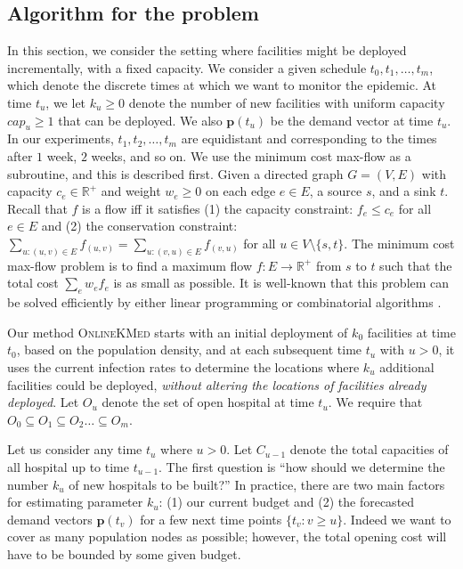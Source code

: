 \subsection*{Algorithm for the \probinc{} problem}
In this section, we consider the setting where facilities might be deployed incrementally, with a fixed capacity. We consider a given schedule $t_0, t_1, \ldots, t_m$, which denote the discrete times at which we want to monitor the epidemic. At time $t_u$, we let $k_u \geq 0$ denote the number of new facilities with uniform capacity $cap_u \geq 1$ that can be deployed. We also $\mathbf{p}(t_u)$ be the demand vector at time $t_u$. In our experiments, $t_1, t_2, \ldots, t_m$ are equidistant and corresponding to the times after $1$ week, $2$ weeks, and so on. 
We use the minimum cost max-flow as a subroutine, and this is described first.
Given a directed graph $G = (V, E)$ with capacity $c_e \in \mathbb{R}^+$ and weight $w_e \geq 0$ on each edge $e \in E$, a source $s$, and a sink $t$. Recall that $f$ is a flow iff it satisfies (1) the capacity constraint: $f_e \leq c_e$ for all $e \in E$ and (2) the conservation constraint: $\sum_{u:(u,v)\in E} f_{(u,v)} = \sum_{u:(v,u) \in E} f_{(v,u)}$ for all $u \in V \setminus \{s, t\}$. The minimum cost max-flow problem is to find a maximum flow $f: E \to \mathbb{R}^+$ from $s$ to $t$ such that the total cost $\sum_e w_e f_e$ is as small as possible.  It is well-known that this problem can be solved efficiently by either linear programming or combinatorial algorithms \cite{flow_book, flow_goldberg, Orlin1997}.


Our method \textsc{OnlineKMed} starts with an initial
deployment of $k_0$ facilities at time $t_0$, based on the population density, and at each subsequent time $t_u$ with $u > 0$, it uses the current infection rates to determine the locations where $k_u$ additional facilities could be deployed, \emph{without altering the locations of facilities already deployed}. Let $O_u$ denote the set of open hospital at time $t_u$. We require that $O_0 \subseteq O_1 \subseteq O_2 \ldots \subseteq O_m$.

Let us consider any time $t_u$ where $u > 0$. Let $C_{u-1}$ denote the total capacities of all hospital up to time $t_{u-1}$. The first question is ``how should we determine the number $k_u$ of new hospitals to be built?'' In practice, there are two main factors for estimating parameter $k_u$: (1) our current budget and (2) the forecasted demand vectors $\mathbf{p}(t_v)$ for a few next time points $\{t_v: v \geq u\}$. Indeed we want to cover as many population nodes as possible; however, the total opening cost will have to be bounded by some given budget.

